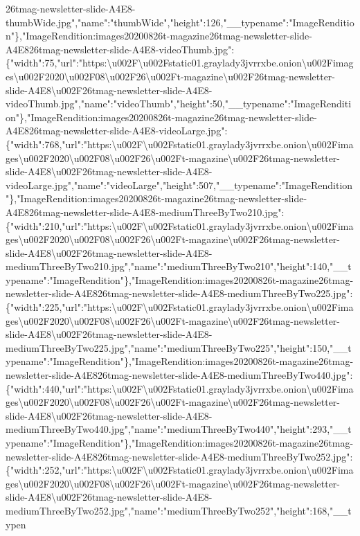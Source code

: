 26tmag-newsletter-slide-A4E8-thumbWide.jpg","name":"thumbWide","height":126,"\_\_typename":"ImageRendition"\},"ImageRendition:images20200826t-magazine26tmag-newsletter-slide-A4E826tmag-newsletter-slide-A4E8-videoThumb.jpg":\{"width":75,"url":"https:\textbackslash{}u002F\textbackslash{}u002Fstatic01.graylady3jvrrxbe.onion\textbackslash{}u002Fimages\textbackslash{}u002F2020\textbackslash{}u002F08\textbackslash{}u002F26\textbackslash{}u002Ft-magazine\textbackslash{}u002F26tmag-newsletter-slide-A4E8\textbackslash{}u002F26tmag-newsletter-slide-A4E8-videoThumb.jpg","name":"videoThumb","height":50,"\_\_typename":"ImageRendition"\},"ImageRendition:images20200826t-magazine26tmag-newsletter-slide-A4E826tmag-newsletter-slide-A4E8-videoLarge.jpg":\{"width":768,"url":"https:\textbackslash{}u002F\textbackslash{}u002Fstatic01.graylady3jvrrxbe.onion\textbackslash{}u002Fimages\textbackslash{}u002F2020\textbackslash{}u002F08\textbackslash{}u002F26\textbackslash{}u002Ft-magazine\textbackslash{}u002F26tmag-newsletter-slide-A4E8\textbackslash{}u002F26tmag-newsletter-slide-A4E8-videoLarge.jpg","name":"videoLarge","height":507,"\_\_typename":"ImageRendition"\},"ImageRendition:images20200826t-magazine26tmag-newsletter-slide-A4E826tmag-newsletter-slide-A4E8-mediumThreeByTwo210.jpg":\{"width":210,"url":"https:\textbackslash{}u002F\textbackslash{}u002Fstatic01.graylady3jvrrxbe.onion\textbackslash{}u002Fimages\textbackslash{}u002F2020\textbackslash{}u002F08\textbackslash{}u002F26\textbackslash{}u002Ft-magazine\textbackslash{}u002F26tmag-newsletter-slide-A4E8\textbackslash{}u002F26tmag-newsletter-slide-A4E8-mediumThreeByTwo210.jpg","name":"mediumThreeByTwo210","height":140,"\_\_typename":"ImageRendition"\},"ImageRendition:images20200826t-magazine26tmag-newsletter-slide-A4E826tmag-newsletter-slide-A4E8-mediumThreeByTwo225.jpg":\{"width":225,"url":"https:\textbackslash{}u002F\textbackslash{}u002Fstatic01.graylady3jvrrxbe.onion\textbackslash{}u002Fimages\textbackslash{}u002F2020\textbackslash{}u002F08\textbackslash{}u002F26\textbackslash{}u002Ft-magazine\textbackslash{}u002F26tmag-newsletter-slide-A4E8\textbackslash{}u002F26tmag-newsletter-slide-A4E8-mediumThreeByTwo225.jpg","name":"mediumThreeByTwo225","height":150,"\_\_typename":"ImageRendition"\},"ImageRendition:images20200826t-magazine26tmag-newsletter-slide-A4E826tmag-newsletter-slide-A4E8-mediumThreeByTwo440.jpg":\{"width":440,"url":"https:\textbackslash{}u002F\textbackslash{}u002Fstatic01.graylady3jvrrxbe.onion\textbackslash{}u002Fimages\textbackslash{}u002F2020\textbackslash{}u002F08\textbackslash{}u002F26\textbackslash{}u002Ft-magazine\textbackslash{}u002F26tmag-newsletter-slide-A4E8\textbackslash{}u002F26tmag-newsletter-slide-A4E8-mediumThreeByTwo440.jpg","name":"mediumThreeByTwo440","height":293,"\_\_typename":"ImageRendition"\},"ImageRendition:images20200826t-magazine26tmag-newsletter-slide-A4E826tmag-newsletter-slide-A4E8-mediumThreeByTwo252.jpg":\{"width":252,"url":"https:\textbackslash{}u002F\textbackslash{}u002Fstatic01.graylady3jvrrxbe.onion\textbackslash{}u002Fimages\textbackslash{}u002F2020\textbackslash{}u002F08\textbackslash{}u002F26\textbackslash{}u002Ft-magazine\textbackslash{}u002F26tmag-newsletter-slide-A4E8\textbackslash{}u002F26tmag-newsletter-slide-A4E8-mediumThreeByTwo252.jpg","name":"mediumThreeByTwo252","height":168,"\_\_typen